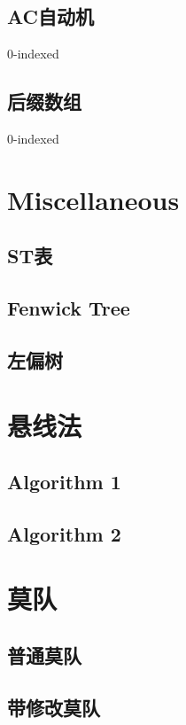 \documentclass{article}
\begin{document}
		\subsection{AC自动机}
		0-indexed
		
		\subsection{后缀数组}
		0-indexed
		

	\newpage

	\section{Miscellaneous}
		\subsection{ST表}
		\subsection{Fenwick Tree}
		\subsection{左偏树}
	\newpage

	\section{悬线法}
		\subsection{Algorithm 1}
		\subsection{Algorithm 2}

	\newpage

	\section{莫队}
		\subsection{普通莫队}
		\subsection{带修改莫队}
\end{document}
